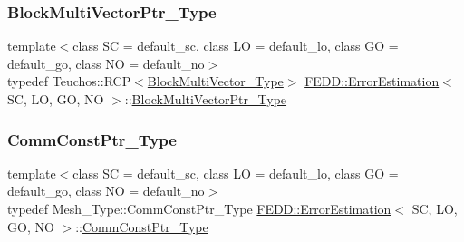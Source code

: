 \mbox{\label{classFEDD_1_1ErrorEstimation_ae9a6299169da55a65a3c3a10a16b455e}} 
\subsubsection{\texorpdfstring{Block\+Multi\+Vector\+Ptr\+\_\+\+Type}{BlockMultiVectorPtr\_Type}}
{\footnotesize\ttfamily template$<$class SC = default\+\_\+sc, class LO = default\+\_\+lo, class GO = default\+\_\+go, class NO = default\+\_\+no$>$ \\
typedef Teuchos\+::\+R\+CP$<$\hyperlink{classFEDD_1_1ErrorEstimation_a91845e337e3d46305cd20c0c9cb08cdc}{Block\+Multi\+Vector\+\_\+\+Type}$>$ \hyperlink{classFEDD_1_1ErrorEstimation}{F\+E\+D\+D\+::\+Error\+Estimation}$<$ SC, LO, GO, NO $>$\+::\hyperlink{classFEDD_1_1ErrorEstimation_ae9a6299169da55a65a3c3a10a16b455e}{Block\+Multi\+Vector\+Ptr\+\_\+\+Type}}

\mbox{\label{classFEDD_1_1ErrorEstimation_a23c88f794d901561ef57840b68c0aa20}} 
\subsubsection{\texorpdfstring{Comm\+Const\+Ptr\+\_\+\+Type}{CommConstPtr\_Type}}
{\footnotesize\ttfamily template$<$class SC = default\+\_\+sc, class LO = default\+\_\+lo, class GO = default\+\_\+go, class NO = default\+\_\+no$>$ \\
typedef Mesh\+\_\+\+Type\+::\+Comm\+Const\+Ptr\+\_\+\+Type \hyperlink{classFEDD_1_1ErrorEstimation}{F\+E\+D\+D\+::\+Error\+Estimation}$<$ SC, LO, GO, NO $>$\+::\hyperlink{classFEDD_1_1ErrorEstimation_a23c88f794d901561ef57840b68c0aa20}{Comm\+Const\+Ptr\+\_\+\+Type}}

\mbox{\label{classFEDD_1_1ErrorEstimation_ac5689e70e0c965f5373f2a716c0250c1}} 

